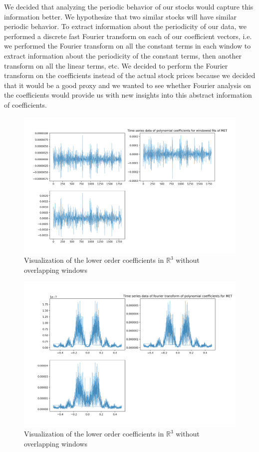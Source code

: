 \documentclass[final]{article}
\begin{document}
We decided that analyzing the periodic behavior of our stocks would capture
this information better. We hypothesize that two similar stocks will have
similar periodic behavior. To extract information about the periodicity of our
data, we performed a discrete fast Fourier transform on each of our coefficient
vectors, i.e. we performed the Fourier transform on all the constant terms in
each window to extract information about the periodicity of the constant terms,
then another transform on all the linear terms, etc. We decided to perform the
Fourier transform on the coefficients instead of the actual stock prices
because we decided that it would be a good proxy and we wanted to see whether
Fourier analysis on the coefficients would provide us with new insights into
this abstract information of coefficients.

\begin{figure}[H]
  \centering
  \includegraphics[width=\linewidth]{img/fourier1}
  \caption{Visualization of the lower order coefficients in $\mathbb{R}^3$
  without overlapping windows}
  \label{fig:coeff}
\end{figure}

\begin{figure}[H]
  \centering
  \includegraphics[width=\linewidth]{img/fourier2}
  \caption{Visualization of the lower order coefficients in $\mathbb{R}^3$
  without overlapping windows}
  \label{fig:coeff}
\end{figure}
\end{document}
